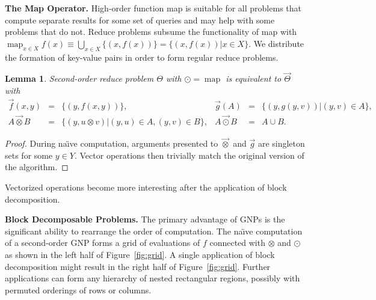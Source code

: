 \documentclass{article}
\newtheorem{lemma}{Lemma}
\newcommand{\maybekillspace}{\vspace{-0.08in}}
\newcommand{\killspace}{\vspace{-0.08in}}
\newcommand{\otimesvec}{\mathbin{\overrightarrow{\otimes}}}
\newcommand{\odotvec}{\mathbin{\overrightarrow{\odot}}}
\DeclareMathOperator*{\map}{map}
\begin{document}
\maybekillspace
{\bf The Map Operator.}  High-order function map is suitable for all
problems that compute separate results for some set of queries and may
help with some problems that do not.  Reduce problems subsume the
functionality of map with $\map_{x \in X} f(x) \equiv \bigcup_{x \in
X} \{(x,f(x))\} = \{(x,f(x)) | x \in X\}$.  We distribute the
formation of key-value pairs in order to form regular reduce problems.
\begin{lemma}
  Second-order reduce problem $\Theta$ with $\odot = \map$ is
  equivalent to $\overrightarrow{\Theta}$ with
  \[ \begin{array}{rclrcl}
    \overrightarrow{f}(x,y) & = & \{(y, f(x,y))\}, & \overrightarrow{g}(A) & = & \{(y, g(y,v)) | (y,v) \in A\}, \\
    A \otimesvec B & = & \{(y, u \otimes v) | (y,u) \in A, (y,v) \in B\}, & A \odotvec B & = & A \cup B.
  \end{array} \]
\end{lemma}
\killspace
\begin{proof}
  During na\"{\i}ve computation, arguments presented to $\otimesvec$
  and $\overrightarrow{g}$ are singleton sets for some $y \in Y$.
  Vector operations then trivially match the original version of the
  algorithm.
\end{proof}
\killspace
\noindent Vectorized operations become more interesting after the
application of block decomposition.


{\bf Block Decomposable Problems.} The primary advantage of GNPs is
the significant ability to rearrange the order of computation.  The
na\"{\i}ve computation of a second-order GNP forms a grid of
evaluations of $f$ connected with $\otimes$ and $\odot$ as shown in
the left half of Figure~\ref{fig:grid}.  A single application of block
decomposition might result in the right half of Figure~\ref{fig:grid}.
Further applications can form any hierarchy of nested rectangular
regions, possibly with permuted orderings of rows or columns.
\end{document}
